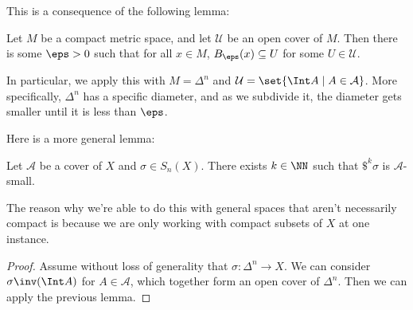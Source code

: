 \documentclass{standalone}
\begin{document}
This is a consequence of the following lemma:
\begin{lemma}
  Let \(M\) be a compact metric space,
  and let \(\mathcal U\) be an open cover of \(M\).
  Then there is some \(\eps > 0\) such that for all \(x \in M\),
  \(B_\eps(x) \subseteq U\) for some \(U \in \mathcal U\).
\end{lemma}
In particular, we apply this with \(M = \Delta^n\) and
\(\mathcal U = \set{\Int A \mid A \in \mathcal A}\).
More specifically, \(\Delta^n\) has a specific diameter,
and as we subdivide it, the diameter gets smaller until
it is less than \(\eps\).

Here is a more general lemma:
\begin{lemma}
  Let \(\mathcal A\) be a cover of \(X\) and \(\sigma \in S_n(X)\).
  There exists \(k \in \NN\) such that \(\$^k \sigma\) is \(\mathcal A\)-small.
\end{lemma}
The reason why we're able to do this with general spaces that aren't
necessarily compact is because we are only working with
compact subsets of \(X\) at one instance.
\begin{proof}
  Assume without loss of generality that \(\sigma \colon \Delta^n \to X\).
  We can consider \(\sigma\inv (\Int A)\) for \(A \in \mathcal A\),
  which together form an open cover of \(\Delta^n\).
  Then we can apply the previous lemma.
\end{proof}
\end{document}
